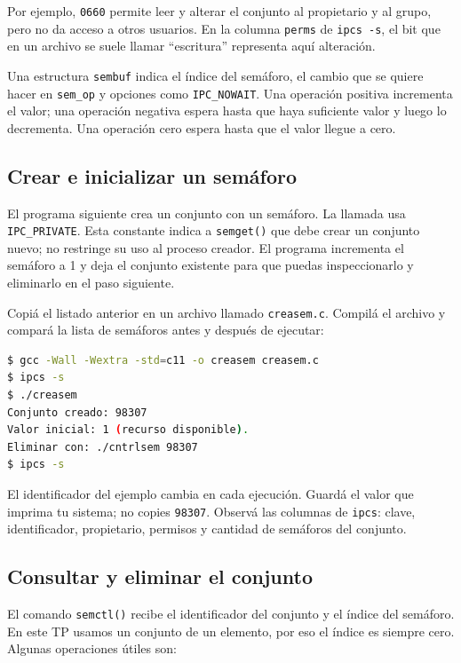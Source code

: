 \documentclass[11pt,a4paper]{article}
\newcommand{\inputcode}[2][]{%
  \par\addvspace{0.2\baselineskip}\noindent
  \begin{minipage}{\linewidth}
    
  \end{minipage}\par\addvspace{0.2\baselineskip}}
\begin{document}
Por ejemplo, \texttt{0660} permite leer y alterar el conjunto al propietario
y al grupo, pero no da acceso a otros usuarios. En la columna \texttt{perms}
de \texttt{ipcs -s}, el bit que en un archivo se suele llamar ``escritura''
representa aquí alteración.

Una estructura \texttt{sembuf} indica el índice del semáforo, el cambio que se
quiere hacer en \texttt{sem\_op} y opciones como \texttt{IPC\_NOWAIT}. Una
operación positiva incrementa el valor; una operación negativa espera hasta
que haya suficiente valor y luego lo decrementa. Una operación cero espera
hasta que el valor llegue a cero.

\subsection{Crear e inicializar un semáforo}

El programa siguiente crea un conjunto con un semáforo. La llamada usa
\texttt{IPC\_PRIVATE}. Esta constante indica a \texttt{semget()} que debe
crear un conjunto nuevo; no restringe su uso al proceso creador. El programa
incrementa el semáforo a 1 y deja el conjunto existente para que puedas
inspeccionarlo y eliminarlo en el paso siguiente.

\inputcode[language=C,basicstyle=\ttfamily\footnotesize]{../examples/tp5/creasem.c}

Copiá el listado anterior en un archivo llamado \texttt{creasem.c}. Compilá el
archivo y compará la lista de semáforos antes y después de ejecutar:

\begin{lstlisting}[language=bash]
$ gcc -Wall -Wextra -std=c11 -o creasem creasem.c
$ ipcs -s
$ ./creasem
Conjunto creado: 98307
Valor inicial: 1 (recurso disponible).
Eliminar con: ./cntrlsem 98307
$ ipcs -s
\end{lstlisting}

El identificador del ejemplo cambia en cada ejecución. Guardá el valor que
imprima tu sistema; no copies \texttt{98307}. Observá las columnas de
\texttt{ipcs}: clave, identificador, propietario, permisos y cantidad de
semáforos del conjunto.

\subsection{Consultar y eliminar el conjunto}

El comando \texttt{semctl()} recibe el identificador del conjunto y el índice
del semáforo. En este TP usamos un conjunto de un elemento, por eso el índice
es siempre cero. Algunas operaciones útiles son:
\end{document}
